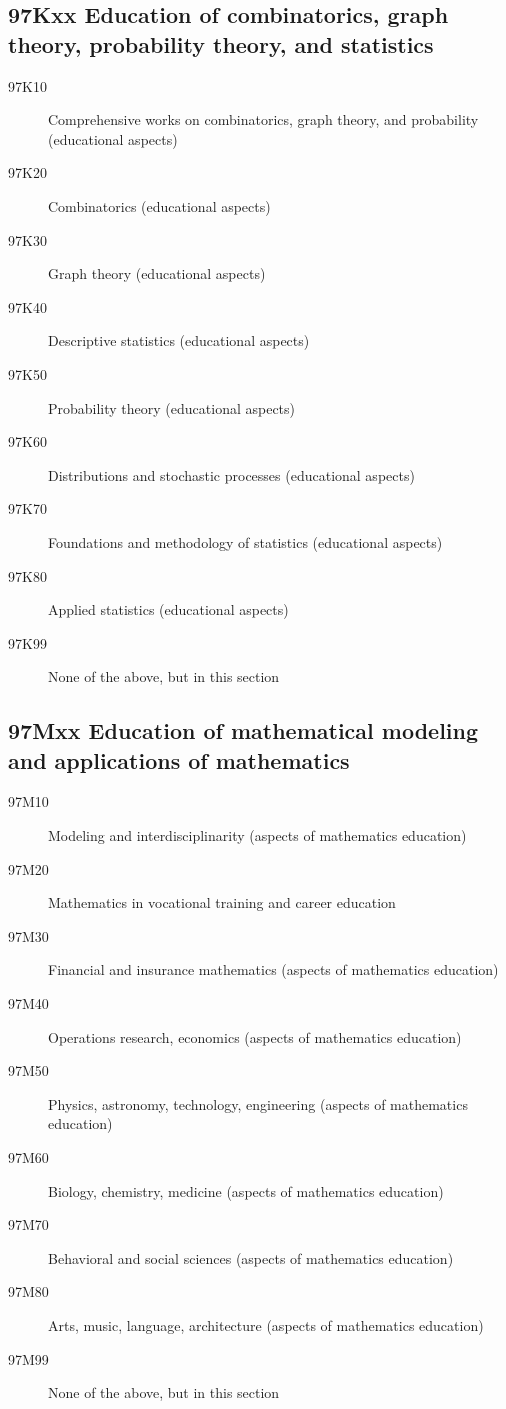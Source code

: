 \documentclass[letterpaper]{article}
\begin{document}
\subsection*{97Kxx  Education of combinatorics, graph theory, probability theory, and statistics }\label{97Kxx}
\begin{description}  
\item [97K10]\label{97K10} Comprehensive works on combinatorics, graph theory, and probability (educational aspects)
\item [97K20]\label{97K20} Combinatorics (educational aspects)
\item [97K30]\label{97K30} Graph theory (educational aspects)
\item [97K40]\label{97K40} Descriptive statistics (educational aspects)
\item [97K50]\label{97K50} Probability theory (educational aspects)
\item [97K60]\label{97K60} Distributions and stochastic processes (educational aspects)
\item [97K70]\label{97K70} Foundations and methodology of statistics (educational aspects)
\item [97K80]\label{97K80} Applied statistics (educational aspects)
\item [97K99]\label{97K99} None of the above, but in this section
\end{description}
\subsection*{97Mxx  Education of mathematical modeling and applications of mathematics }\label{97Mxx}
\begin{description}  
\item [97M10]\label{97M10} Modeling and interdisciplinarity (aspects of mathematics education)
\item [97M20]\label{97M20} Mathematics in vocational training and career education
\item [97M30]\label{97M30} Financial and insurance mathematics (aspects of mathematics education)
\item [97M40]\label{97M40} Operations research, economics (aspects of mathematics education)
\item [97M50]\label{97M50} Physics, astronomy, technology, engineering (aspects of mathematics education)
\item [97M60]\label{97M60} Biology, chemistry, medicine (aspects of mathematics education)
\item [97M70]\label{97M70} Behavioral and social sciences (aspects of mathematics education)
\item [97M80]\label{97M80} Arts, music, language, architecture (aspects of mathematics education)
\item [97M99]\label{97M99} None of the above, but in this section
\end{description}
\end{document}
